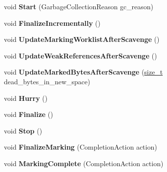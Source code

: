 \begin{DoxyCompactItemize}
void {\bfseries Start} (Garbage\+Collection\+Reason gc\+\_\+reason)
\item 
\mbox{\label{classv8_1_1internal_1_1IncrementalMarking_ae719e288cf9057027469f9fe66f27631}} 
void {\bfseries Finalize\+Incrementally} ()
\item 
\mbox{\label{classv8_1_1internal_1_1IncrementalMarking_aad907297f77dbf7d688e0e4463610131}} 
void {\bfseries Update\+Marking\+Worklist\+After\+Scavenge} ()
\item 
\mbox{\label{classv8_1_1internal_1_1IncrementalMarking_a77d88949323a3025b9a12f0ce64c9be7}} 
void {\bfseries Update\+Weak\+References\+After\+Scavenge} ()
\item 
\mbox{\label{classv8_1_1internal_1_1IncrementalMarking_ac0412c5ceb8ec8d4538f451fca84ccf2}} 
void {\bfseries Update\+Marked\+Bytes\+After\+Scavenge} (\mbox{\hyperlink{classsize__t}{size\+\_\+t}} dead\+\_\+bytes\+\_\+in\+\_\+new\+\_\+space)
\item 
\mbox{\label{classv8_1_1internal_1_1IncrementalMarking_a5f19bb1f9e9be0aed81f81429c3bd27f}} 
void {\bfseries Hurry} ()
\item 
\mbox{\label{classv8_1_1internal_1_1IncrementalMarking_a5b27a0985064f3ced493229bdeb0b688}} 
void {\bfseries Finalize} ()
\item 
\mbox{\label{classv8_1_1internal_1_1IncrementalMarking_a2bc86ff237f59993b79b53abf5cd6ea6}} 
void {\bfseries Stop} ()
\item 
\mbox{\label{classv8_1_1internal_1_1IncrementalMarking_a2ec4b09648d70622cfc0654ee5c3ba65}} 
void {\bfseries Finalize\+Marking} (Completion\+Action action)
\item 
\mbox{\label{classv8_1_1internal_1_1IncrementalMarking_ae54d6d522c8efb23793f41e3b1c41630}} 
void {\bfseries Marking\+Complete} (Completion\+Action action)

\end{DoxyCompactItemize}
